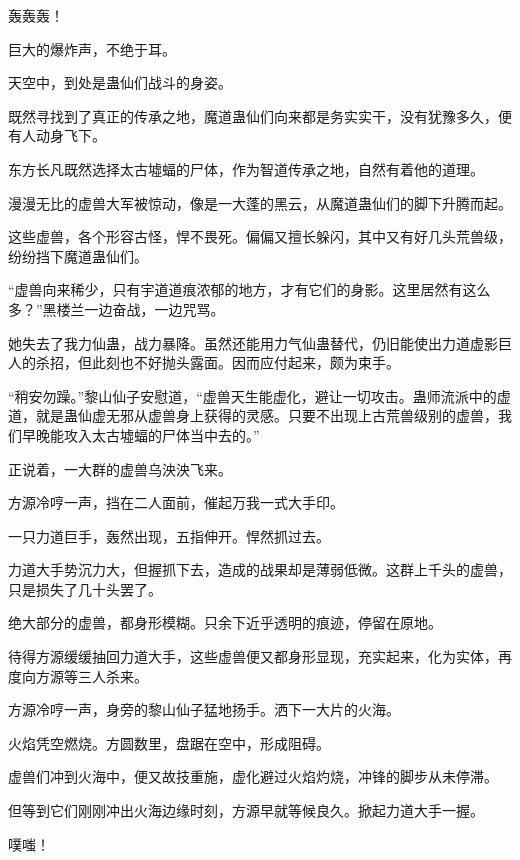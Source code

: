 
\begin{this_body}



轰轰轰！

巨大的爆炸声，不绝于耳。

天空中，到处是蛊仙们战斗的身姿。

既然寻找到了真正的传承之地，魔道蛊仙们向来都是务实实干，没有犹豫多久，便有人动身飞下。

东方长凡既然选择太古墟蝠的尸体，作为智道传承之地，自然有着他的道理。

漫漫无比的虚兽大军被惊动，像是一大蓬的黑云，从魔道蛊仙们的脚下升腾而起。

这些虚兽，各个形容古怪，悍不畏死。偏偏又擅长躲闪，其中又有好几头荒兽级，纷纷挡下魔道蛊仙们。

“虚兽向来稀少，只有宇道道痕浓郁的地方，才有它们的身影。这里居然有这么多？”黑楼兰一边奋战，一边咒骂。

她失去了我力仙蛊，战力暴降。虽然还能用力气仙蛊替代，仍旧能使出力道虚影巨人的杀招，但此刻也不好抛头露面。因而应付起来，颇为束手。

“稍安勿躁。”黎山仙子安慰道，“虚兽天生能虚化，避让一切攻击。蛊师流派中的虚道，就是蛊仙虚无邪从虚兽身上获得的灵感。只要不出现上古荒兽级别的虚兽，我们早晚能攻入太古墟蝠的尸体当中去的。”

正说着，一大群的虚兽乌泱泱飞来。

方源冷哼一声，挡在二人面前，催起万我一式大手印。

一只力道巨手，轰然出现，五指伸开。悍然抓过去。

力道大手势沉力大，但握抓下去，造成的战果却是薄弱低微。这群上千头的虚兽，只是损失了几十头罢了。

绝大部分的虚兽，都身形模糊。只余下近乎透明的痕迹，停留在原地。

待得方源缓缓抽回力道大手，这些虚兽便又都身形显现，充实起来，化为实体，再度向方源等三人杀来。

方源冷哼一声，身旁的黎山仙子猛地扬手。洒下一大片的火海。

火焰凭空燃烧。方圆数里，盘踞在空中，形成阻碍。

虚兽们冲到火海中，便又故技重施，虚化避过火焰灼烧，冲锋的脚步从未停滞。

但等到它们刚刚冲出火海边缘时刻，方源早就等候良久。掀起力道大手一握。

噗嗤！


\end{this_body}
